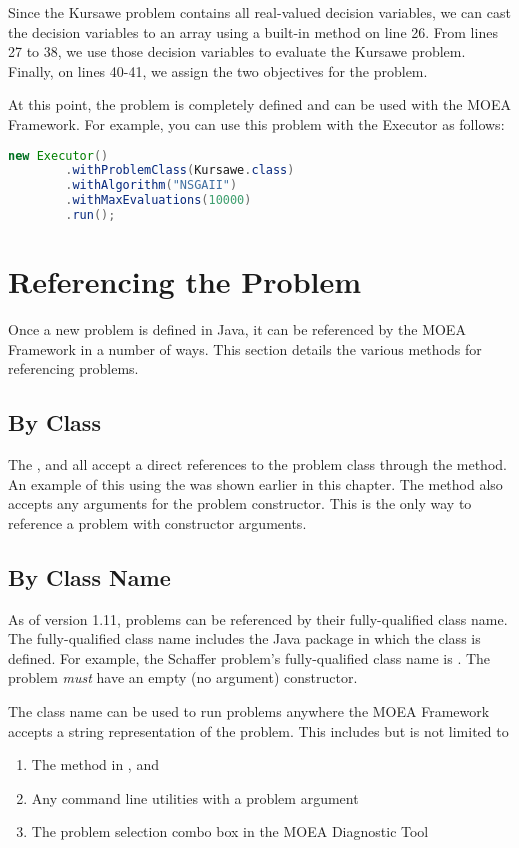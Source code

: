 Since the Kursawe problem contains all real-valued decision variables, we can cast the decision variables to an array using a built-in method on line 26.  From lines 27 to 38, we use those decision variables to evaluate the Kursawe problem.  Finally, on lines 40-41, we assign the two objectives for the problem.

At this point, the problem is completely defined and can be used with the MOEA Framework.  For example, you can use this problem with the Executor as follows:

\begin{lstlisting}[language=Java]
new Executor()
		.withProblemClass(Kursawe.class)
		.withAlgorithm("NSGAII")
		.withMaxEvaluations(10000)
		.run();
\end{lstlisting}

\section{Referencing the Problem}
Once a new problem is defined in Java, it can be referenced by the MOEA Framework in a number of ways.  This section details the various methods for referencing problems.

\subsection{By Class}
The ,  and  all accept a direct references to the problem class through the  method.  An example of this using the  was shown earlier in this chapter.  The  method also accepts any arguments for the problem constructor.  This is the only way to reference a problem with constructor arguments.

\subsection{By Class Name}
As of version 1.11, problems can be referenced by their fully-qualified class name.  The fully-qualified class name includes the Java package in which the class is defined.  For example, the Schaffer problem's fully-qualified class name is .  The problem \emph{must} have an empty (no argument) constructor.

The class name can be used to run problems anywhere the MOEA Framework accepts a string representation of the problem.  This includes but is not limited to
\begin{enumerate}
  \item The  method in ,  and 
  \item Any command line utilities with a problem argument
  \item The problem selection combo box in the MOEA Diagnostic Tool
\end{enumerate}

